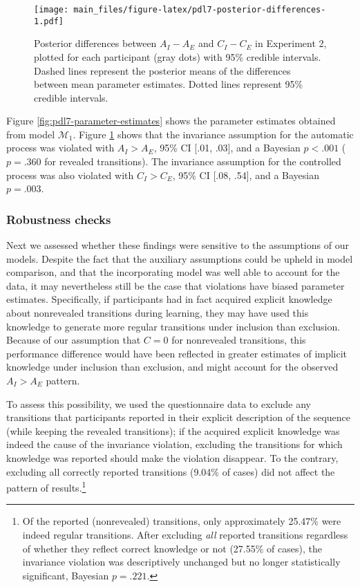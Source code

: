 \documentclass[man]{apa6}
\theoremstyle{definition}
\theoremstyle{definition}
\theoremstyle{definition}
\theoremstyle{remark}
\begin{document}
\begin{figure}
\centering
\texttt{[image: main\_files/figure-latex/pdl7-posterior-differences-1.pdf]}
\caption{\label{fig:pdl7-posterior-differences}Posterior differences between
\(A_I - A_E\) and \(C_I - C_E\) in Experiment 2, plotted for each
participant (gray dots) with 95\% credible intervals. Dashed lines
represent the posterior means of the differences between mean parameter
estimates. Dotted lines represent 95\% credible intervals.}
\end{figure}

Figure \ref{fig:pdl7-parameter-estimates} shows the parameter estimates
obtained from model \(\mathcal{M}_1\). Figure
\ref{fig:pdl7-posterior-differences} shows that the invariance
assumption for the automatic process was violated with \(A_I > A_E\),
95\% CI {[}.01, .03{]}, and a Bayesian \(p < .001\) (\(p = .360\) for
revealed transitions). The invariance assumption for the controlled
process was also violated with \(C_I > C_E\), 95\% CI {[}.08, .54{]},
and a Bayesian \(p = .003\).

\subsubsection{Robustness checks}\label{robustness-checks}

Next we assessed whether these findings were sensitive to the
assumptions of our models. Despite the fact that the auxiliary
assumptions could be upheld in model comparison, and that the
incorporating model was well able to account for the data, it may
nevertheless still be the case that violations have biased parameter
estimates. Specifically, if participants had in fact acquired explicit
knowledge about nonrevealed transitions during learning, they may have
used this knowledge to generate more regular transitions under inclusion
than exclusion. Because of our assumption that \(C = 0\) for nonrevealed
transitions, this performance difference would have been reflected in
greater estimates of implicit knowledge under inclusion than exclusion,
and might account for the observed \(A_{I} > A_{E}\) pattern.

To assess this possibility, we used the questionnaire data to exclude
any transitions that participants reported in their explicit description
of the sequence (while keeping the revealed transitions); if the
acquired explicit knowledge was indeed the cause of the invariance
violation, excluding the transitions for which knowledge was reported
should make the violation disappear. To the contrary, excluding all
correctly reported transitions (9.04\% of cases) did not affect the
pattern of results.\footnote{Of the reported (nonrevealed) transitions,
  only approximately 25.47\% were indeed regular transitions. After
  excluding \emph{all} reported transitions regardless of whether they
  reflect correct knowledge or not (27.55\% of cases), the invariance
  violation was descriptively unchanged but no longer statistically
  significant, Bayesian \(p = .221\).}
\end{document}
